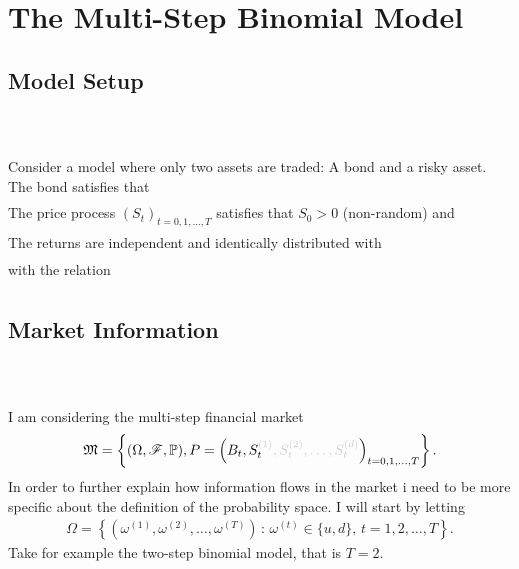 \documentclass{beamer}
\numberwithin{equation}{section}
\begin{document}
\section{The Multi-Step Binomial Model}

\subsection{Model Setup}
\begin{frame}\frametitle{{\normalsize \secname} \\ {\large \subsecname}}
    Consider a model where only two assets are traded: A bond and a risky asset.
    The bond satisfies that
    \begin{align}
    \end{align}
    The price process $(S_t)_{t = 0,1, \ldots, T}$ satisfies that $S_0 > 0$ (non-random) and
    \begin{align}
    \end{align}
    The returns are independent and identically distributed with
    \begin{align}
    \end{align}
    with the relation
    \begin{align}
    \end{align}
\end{frame}

\subsection{Market Information}

\begin{frame}\frametitle{{\normalsize \secname} \\ {\large \subsecname}}
    I am considering the multi-step financial market
    \begin{align}
        \mathfrak{M} = \left\{
            (\Omega, \mathscr{F}, \mathbb{P}),
            P = \left(
                B_t, S_t^{{\color{black!20!white}(1)}}{\color{black!20!white}, S_t^{(2)}, \ldots, S_t^{(d)}}
            \right)_{t = 0,1, \ldots, T}
        \right\}.
    \end{align}
    In order to further explain how information flows in the market i need to be more specific about the definition of the probability space.
    I will start by letting
    \begin{align}
        \Omega = \left\{
            \left(
                \omega^{(1)}, \omega^{(2)}, \ldots, \omega^{(T)}
            \right)
            \, : \,
            \omega^{(t)} \in \{u,d\}, \, t = 1, 2, \ldots, T
        \right\}.
    \end{align}
    Take for example the two-step binomial model, that is $T = 2$.
\end{frame}
\end{document}
